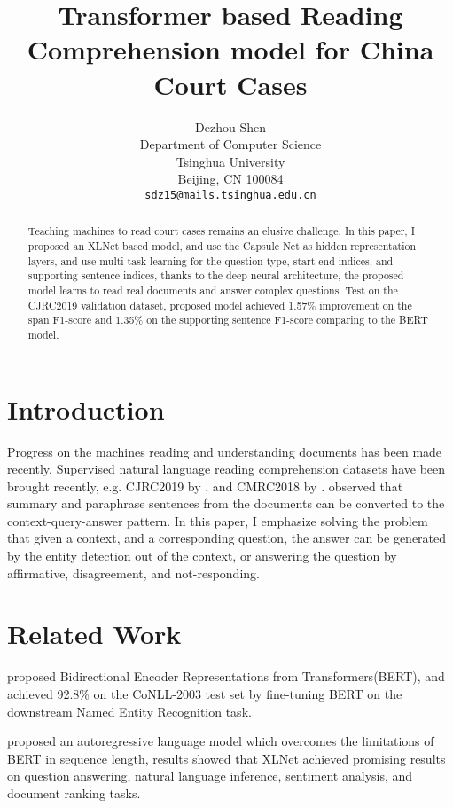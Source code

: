 \documentclass[11pt,a4paper]{article}
\title{Transformer based Reading Comprehension model for China Court Cases}
\author{Dezhou Shen \\
  Department of Computer Science\\
  Tsinghua University\\
  Beijing, CN 100084\\
  \texttt{sdz15@mails.tsinghua.edu.cn} \\}
\date{}
\begin{document}
\maketitle
\begin{abstract}
 Teaching machines to read court cases remains an elusive challenge.
 In this paper, I proposed an XLNet based model, and use the Capsule Net as hidden representation layers,
 and use multi-task learning for the question type, start-end indices, and supporting sentence indices,
 thanks to the deep neural architecture, the proposed model learns to read real documents and answer complex questions.
 Test on the CJRC2019 validation dataset, proposed model achieved 1.57\% improvement on the span F1-score and 1.35\% on the supporting sentence F1-score comparing to the BERT model.

\end{abstract}

\section{Introduction}

  Progress on the machines reading and understanding documents has been made recently.
  Supervised natural language reading comprehension datasets have been brought recently, e.g. CJRC2019 by \citet{duan2019cjrc}, and CMRC2018 by \citet{cui2019span}.
  \citet{Hermann2015Teaching} observed that summary and paraphrase sentences from the documents can be converted to the context-query-answer pattern.
  In this paper, I emphasize solving the problem that given a context, and a corresponding question, the answer can be generated by the entity detection out of the context,
  or answering the question by affirmative, disagreement, and not-responding.

\section{Related Work}

  \citet{devlin2019bert} proposed Bidirectional Encoder Representations from Transformers(BERT), and achieved 92.8\% on the CoNLL-2003 test set by
fine-tuning BERT on the downstream Named Entity Recognition task.

  \citet{yang2019xlnet} proposed an autoregressive language model which overcomes the limitations of BERT in sequence length,
results showed that XLNet achieved promising results on question answering, natural language inference, sentiment analysis, and document ranking tasks.
\end{document}
